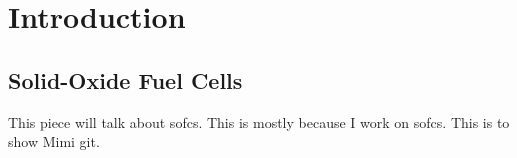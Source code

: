 


\chapter{Introduction}

\section{Solid-Oxide Fuel Cells}

This piece will talk about \glspl{sofc}.
This is mostly because I work on \glspl{sofc}.
This is to show Mimi git.
\lipsum\cite{Wang2006a}
